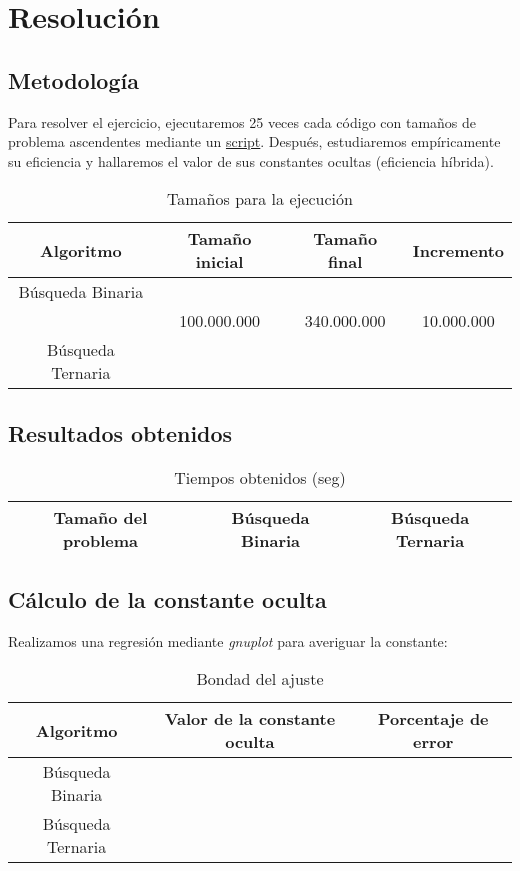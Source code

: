 \documentclass[12pt,spanish]{article}
\begin{document}
\section{Resolución}

\subsection{Metodología}
Para resolver el ejercicio, ejecutaremos 25 veces cada código con tamaños de problema ascendentes mediante un \textcolor{blue!50}{\hyperref[script]{script}}.
Después, estudiaremos empíricamente su eficiencia y hallaremos el valor de sus constantes ocultas (eficiencia híbrida). 

\begin{table}[H]
\centering
\begin{tabular}{|c|c|c|c|}
\hline
\textbf{Algoritmo} & \textbf{Tamaño inicial} & \textbf{Tamaño final} & \textbf{Incremento}\\
\hline
Búsqueda Binaria & & &\\
& 100.000.000 & 340.000.000 & 10.000.000\\
Búsqueda Ternaria & & &\\
\hline
\end{tabular}
\caption{Tamaños para la ejecución}
\end{table}

\subsection{Resultados obtenidos}
\begin{table}[H]
\centering
\begin{tabular}{|c|c|c|}
\hline
\textbf{Tamaño del problema} & \textbf{Búsqueda Binaria} & \textbf{Búsqueda Ternaria}\\
\hline

\end{tabular}
\caption{Tiempos obtenidos (seg)}
\end{table}

\subsection{Cálculo de la constante oculta}
Realizamos una regresión mediante \emph{gnuplot} para averiguar la constante:
\begin{table}[H]
\begin{tabular}{|c|c|c|}
\hline
\textbf{Algoritmo} & \textbf{Valor de la constante oculta} & \textbf{Porcentaje de error}\\
\hline
Búsqueda Binaria & & \\
\hline
Búsqueda Ternaria & & \\
\hline
\end{tabular}
\caption{Bondad del ajuste}
\end{table}
\end{document}
